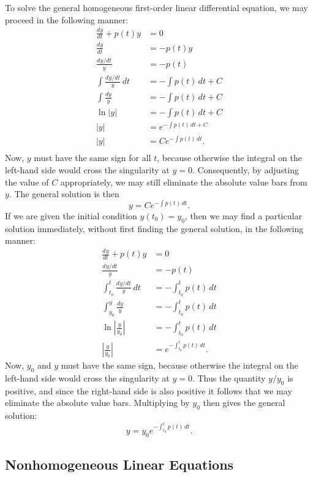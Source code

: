 \documentclass{myart}
\newcommand{\deriv}[3][]{\frac{d^{#1}#2}{d#3^{#1}}}
\newcommand{\fderiv}[3][]{d^{#1}#2/d#3^{#1}}
\begin{document}
To solve the general homogeneous first-order linear differential equation, we may proceed in the following manner:
\begin{align*}
\deriv{y}{t} + p(t)y &= 0 \\
\deriv{y}{t} &= -p(t)y \\
\frac{\fderiv{y}{t}}{y} &= -p(t) \\
\int \frac{\fderiv{y}{t}}{y} \,dt &= -\int p(t) \,dt + C \\
\int \frac{dy}{y} &= -\int p(t) \,dt + C \\
\ln |y| &= -\int p(t) \,dt + C \\
|y| &= e^{-\int p(t) \,dt + C} \\
|y| &= Ce^{-\int p(t) \,dt}. \\
\end{align*}
Now, $y$ must have the same sign for all $t$, because otherwise the integral on the left-hand side would cross the singularity at $y = 0$. Consequently, by adjusting the value of $C$ appropriately, we may still eliminate the absolute value bars from $y$. The general solution is then
\begin{equation*}
y = Ce^{-\int p(t) \,dt}.
\end{equation*}
If we are given the initial condition $y(t_0) = y_0$, then we may find a particular solution immediately, without first finding the general solution, in the following manner:
\begin{align*}
\deriv{y}{t} + p(t)y &= 0 \\
\frac{\fderiv{y}{t}}{y} &= -p(t) \\
\int_{t_0}^t \frac{\fderiv{y}{t}}{y} \,dt &= -\int_{t_0}^t p(t) \,dt \\
\int_{y_0}^y \frac{dy}{y} &= -\int_{t_0}^t p(t) \,dt \\
\ln \left|\frac{y}{y_0}\right| &= -\int_{t_0}^t p(t) \,dt \\
\left|\frac{y}{y_0}\right| &= e^{-\int_{t_0}^t p(t) \,dt}.
\end{align*}
Now, $y_0$ and $y$ must have the same sign, because otherwise the integral on the left-hand side would cross the singularity at $y = 0$. Thus the quantity $y/y_0$ is positive, and since the right-hand side is also positive it follows that we may eliminate the absolute value bars. Multiplying by $y_0$ then gives the general solution:
\begin{equation*}
y = y_0e^{-\int_{t_0}^t p(t) \,dt}.
\end{equation*}

\subsection{Nonhomogeneous Linear Equations} \label{subsec:first order nonhomogeneous}
\end{document}
